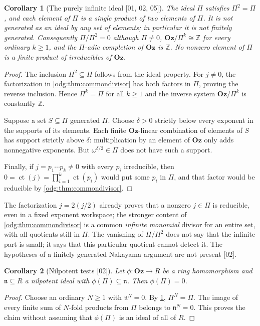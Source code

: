 \documentclass[11pt,oneside]{article}
\numberwithin{equation}{section}
\newtheorem{corollary}[corollary]{Corollary}
\theoremstyle{definition}
\theoremstyle{remark}
\newcommand{\Oz}{\mathbf{Oz}}
\newcommand{\Z}{\mathbb Z}
\newcommand{\ct}{\operatorname{ct}}
\newcommand{\src}[1]{\textup{\textsf{\small[#1]}}}
\begin{document}
\begin{corollary}[The purely infinite ideal \src{01, 02, 05}]\label{odg:cor:Pglobal}\label{odg:cor:Jglobal}
The ideal $\Pi$ satisfies $\Pi^2=\Pi$, and each element of $\Pi$ is a single
product of two elements of $\Pi$. It is not generated as an ideal by any set
of elements; in particular it is not finitely generated. Consequently
$\Pi/\Pi^2=0$ although $\Pi\ne0$, $\Oz/\Pi^k\cong\Z$ for every ordinary
$k\ge1$, and the $\Pi$-adic completion of $\Oz$ is $\Z$. No nonzero element
of $\Pi$ is a finite product of irreducibles of $\Oz$.
\end{corollary}
\begin{proof}
The inclusion $\Pi^2\subseteq\Pi$ follows from the ideal property. For
$j\ne0$, the factorization in \cref{odg:thm:commondivisor} has both factors
in $\Pi$, proving the reverse inclusion. Hence $\Pi^k=\Pi$ for all $k\ge1$ and
the inverse system $\Oz/\Pi^k$ is constantly $\Z$.

Suppose a set $S\subseteq\Pi$ generated $\Pi$. Choose $\delta>0$
strictly below every exponent in the supports of its elements. Each finite
$\Oz$-linear combination of elements of $S$ has support strictly above
$\delta$: multiplication by an element of $\Oz$ only adds nonnegative
exponents. But $\omega^{\delta/2}\in\Pi$ does not have such a support.

Finally, if $j=p_1\cdots p_k\ne0$ with every $p_i$ irreducible, then
$0=\ct(j)=\prod_{i=1}^k\ct(p_i)$ would put some $p_i$ in $\Pi$, and that
factor would be reducible by \cref{odg:thm:commondivisor}.
\end{proof}

The factorization $j=2(j/2)$ already proves that a nonzero $j\in\Pi$ is
reducible, even in a fixed exponent workspace; the stronger content of
\cref{odg:thm:commondivisor} is a common \emph{infinite monomial} divisor for
an entire set, with all quotients still in $\Pi$. The vanishing of
$\Pi/\Pi^2$ does not say that the infinite part is small; it says that this
particular quotient cannot detect it. The hypotheses of a finitely generated
Nakayama argument are not present \src{02}.

\begin{corollary}[Nilpotent tests \src{02}]\label{odg:cor:nilpotent}
Let $\phi:\Oz\to R$ be a ring homomorphism and $\mathfrak n\subseteq R$ a
nilpotent ideal with $\phi(\Pi)\subseteq\mathfrak n$. Then $\phi(\Pi)=0$.
\end{corollary}
\begin{proof}
Choose an ordinary $N\ge1$ with $\mathfrak n^N=0$. By
\cref{odg:cor:Pglobal}, $\Pi^N=\Pi$. The image of every finite sum of
$N$-fold products from $\Pi$ belongs to $\mathfrak n^N=0$. This proves the
claim without assuming that $\phi(\Pi)$ is an ideal of all of $R$.
\end{proof}
\end{document}
